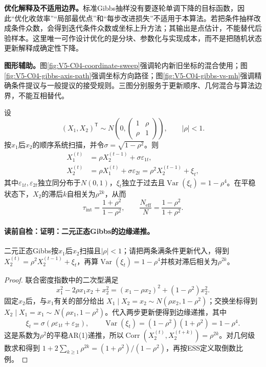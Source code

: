 \label{struct:V5-C04-CH16}
\textbf{优化解释及不适用边界。}标准Gibbs抽样没有要逐轮单调下降的目标函数，因此“优化收敛率”“局部最优点”和“每步改进损失”不适用于本算法。若把条件抽样改成条件众数，会得到迭代条件众数或坐标上升方法；其输出是点估计，不能替代后验样本。这里唯一可作设计优化的是分块、参数化与实现成本，而不是把随机状态更新解释成确定性下降。

\label{struct:V5-C04-CH17}
\textbf{图形辅助。}图\ref{fig:V5-C04-coordinate-sweep}强调轮内新旧坐标的混合使用；图\ref{fig:V5-C04-gibbs-axis-path}强调坐标方向路径；图\ref{fig:V5-C04-gibbs-vs-mh}强调精确条件提议与一般提议的接受规则。三图分别服务于更新顺序、几何混合与算法边界，不能互相替代。

\label{struct:V5-C04-CH18}
\begin{proposition}[二元正态Gibbs的边缘递推]\label{prop:V5-C04-bivariate-normal}
设
\[
(X_1,X_2)^\mathsf T\sim
N\!\left(0,
\begin{pmatrix}1&\rho\\ \rho&1\end{pmatrix}\right),
\qquad |\rho|<1.
\]
按$x_1$后$x_2$的顺序系统扫描，并令$\sigma=\sqrt{1-\rho^2}$。则
\begin{align}
X_1^{(t)}&=\rho X_2^{(t-1)}+\sigma\varepsilon_{1t},\\
X_2^{(t)}&=\rho X_1^{(t)}+\sigma\varepsilon_{2t}
=\rho^2X_2^{(t-1)}+\xi_t,
\end{align}
其中$\varepsilon_{1t},\varepsilon_{2t}$独立同分布于$N(0,1)$，$\xi_t$独立于过去且$\operatorname{Var}(\xi_t)=1-\rho^4$。在平稳状态下，$X_2$的滞后$k$自相关为$\rho^{2k}$，从而
\[
\tau_{\mathrm{int}}=\frac{1+\rho^2}{1-\rho^2},
\qquad
\frac{N_{\mathrm{eff}}}{N}=\frac{1-\rho^2}{1+\rho^2}.
\]
\end{proposition}
\paragraph{读前自检：证明：二元正态Gibbs的边缘递推。}二元正态Gibbs按$x_1$后$x_2$扫描且$|\rho|<1$；请把两条满条件更新代入，得到$X_2^{(t)}=\rho^2X_2^{(t-1)}+\xi_t$，再算$\operatorname{Var}(\xi_t)=1-\rho^4$并核对滞后相关为$\rho^{2k}$。\par

\begin{proof}
联合密度指数中的二次型满足
\[
x_1^2-2\rho x_1x_2+x_2^2
=(x_1-\rho x_2)^2+(1-\rho^2)x_2^2.
\]
固定$x_2$后，与$x_1$有关的部分给出
$X_1\mid X_2=x_2\sim N(\rho x_2,1-\rho^2)$；交换坐标得到
$X_2\mid X_1=x_1\sim N(\rho x_1,1-\rho^2)$。代入两步更新便得到边缘递推，其中
\[
\xi_t=\sigma(\rho\varepsilon_{1t}+\varepsilon_{2t}),
\qquad
\operatorname{Var}(\xi_t)
=(1-\rho^2)(1+\rho^2)=1-\rho^4.
\]
这是系数为$\rho^2$的平稳AR(1)递推，所以$\operatorname{Corr}(X_2^{(t)},X_2^{(t+k)})=\rho^{2k}$。对几何级数求和得到
$1+2\sum_{k\ge1}\rho^{2k}=(1+\rho^2)/(1-\rho^2)$，再按ESS定义取倒数比例。
\end{proof}

